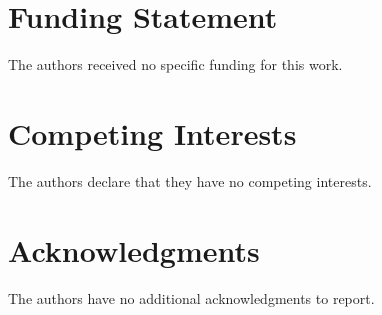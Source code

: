 \documentclass[10pt,letterpaper]{article}
\begin{document}
\section*{Funding Statement}
The authors received no specific funding for this work.

\section*{Competing Interests}
The authors declare that they have no competing interests.

\section*{Acknowledgments}

The authors have no additional acknowledgments to report.

\nolinenumbers


\end{document}
